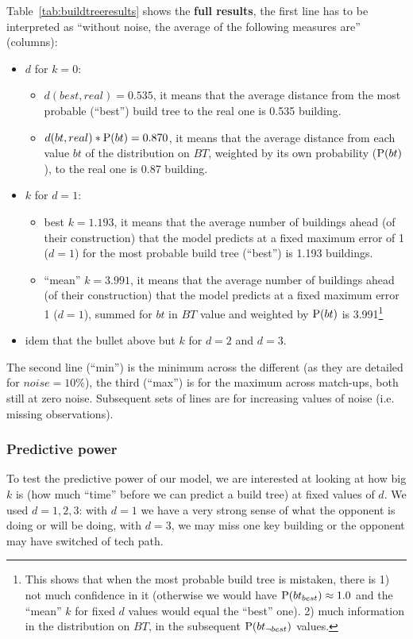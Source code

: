 Table~\ref{tab:buildtreeresults} shows the \textbf{full results}, the first line has to be interpreted as ``without noise, the average of the following measures are'' (columns):
\begin{itemize}
    \item $d$ for $k=0$:
        \begin{itemize}
            \item $d(best,real) = 0.535$, it means that the average distance from the most probable (``best'') build tree to the real one is 0.535 building.
            \item $d(bt,real)*\mathrm{P}(bt) = 0.870$, it means that the average distance from each value $bt$ of the distribution on $BT$, weighted by its own probability ($\mathrm{P}(bt)$), to the real one is 0.87 building.
        \end{itemize}
    \item $k$ for $d=1$:
        \begin{itemize}
            \item best $k=1.193$, it means that the average number of buildings ahead (of their construction) that the model predicts at a fixed maximum error of 1 ($d=1$) for the most probable build tree (``best'') is 1.193 buildings.
            \item ``mean'' $k=3.991$, it means that the average number of buildings ahead (of their construction) that the model predicts at a fixed maximum error 1 ($d=1$), summed for $bt$ in $BT$ value and weighted by $\mathrm{P}(bt)$ is 3.991\footnote{This shows that when the most probable build tree is mistaken, there is 1) not much confidence in it (otherwise we would have $\mathrm{P}(bt_{best}) \approx 1.0$ and the ``mean'' $k$ for fixed $d$ values would equal the ``best'' one). 2) much information in the distribution on $BT$, in the subsequent $\mathrm{P}(bt_{\neg best})$ values.}
        \end{itemize}
    \item idem that the bullet above but $k$ for $d=2$ and $d=3$.
\end{itemize}
The second line (``min'') is the minimum across the different  (as they are detailed for $noise=10\%$), the third (``max'') is for the maximum across match-ups, both still at zero noise. Subsequent sets of lines are for increasing values of noise (i.e. missing observations).

\subsubsection{Predictive power}
To test the predictive power of our model, we are interested at looking at how big $k$ is (how much ``time'' before we can predict a build tree) at fixed values of $d$. We used $d=1,2,3$: with $d=1$ we have a very strong sense of what the opponent is doing or will be doing, with $d=3$, we may miss one key building or the opponent may have switched of tech path. 

